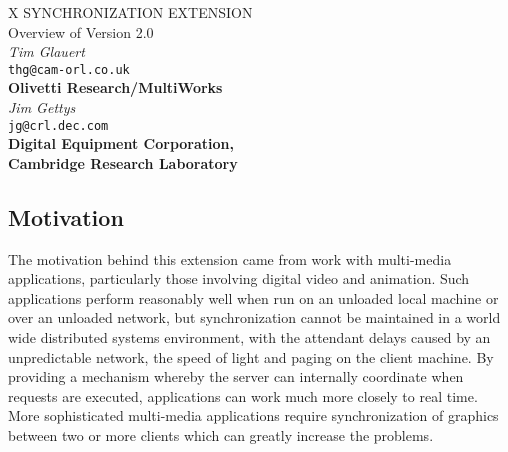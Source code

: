 %
%
%


\setlength{\parindent}{0 pt}
\setlength{\parskip}{6pt}



\begin{center}

{\large X SYNCHRONIZATION EXTENSION}\\[10pt]
{\large Overview of Version 2.0}\\[15pt]
{\it Tim Glauert}\\[0pt]
{\tt thg@cam-orl.co.uk}\\[0pt]
{\bf Olivetti Research/MultiWorks}\\[5pt]
{\it Jim Gettys}\\[0pt]
{\tt jg@crl.dec.com}\\[0pt]
{\bf Digital Equipment Corporation,}\\[0pt]
{\bf Cambridge Research Laboratory}

\end {center}

\subsection*{Motivation}

The motivation behind this extension came from work with multi-media
applications, particularly those involving digital video and animation. Such
applications perform reasonably well when run on an unloaded local machine or
over an unloaded network, but synchronization cannot be maintained in a world
wide distributed systems environment, with the attendant delays caused by an
unpredictable network, the speed of light and paging on the client machine.
By providing a mechanism whereby the server can internally coordinate
when requests are executed, applications can work much more closely to real
time.  More sophisticated multi-media applications require synchronization of
graphics between two or more clients which can greatly increase the problems.

